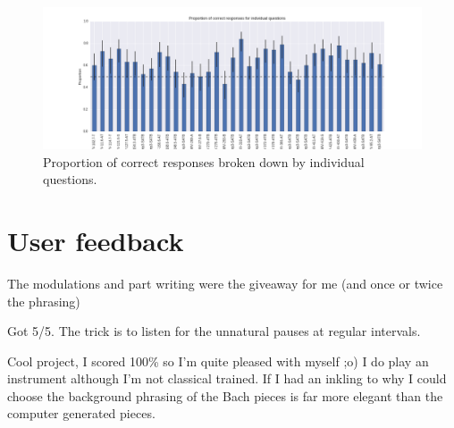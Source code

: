 \documentclass[dissertation.tex]{subfiles}
\begin{document}
\begin{figure}[htpb]
  \centering
  \includegraphics[width=1.0\linewidth]{Figures/responses-name.png}
  \caption{Proportion of correct responses broken down by individual questions.}
  \label{fig:responses-name}
\end{figure}


\section{User feedback}

The modulations and part writing were the giveaway for me (and once or twice the phrasing)

Got 5/5. The trick is to listen for the unnatural pauses at regular intervals.

Cool project, I scored 100\% so I'm quite pleased with myself ;o) I do
play an instrument although I'm not classical trained. If I had an
inkling to why I could choose the background phrasing of the Bach
pieces is far more elegant than the computer generated pieces.

\printbibliography
\end{document}
